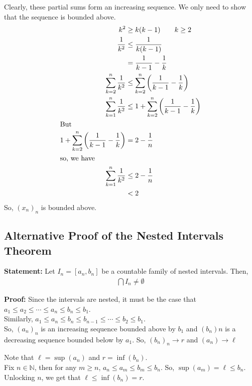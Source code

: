 \documentclass[10pt]{extarticle}
\newcommand{\N}{\mathbb{N}}
\begin{document}
    Clearly, these partial sums form an increasing sequence. We only need to show that the sequence is bounded above.
    \begin{align*}
      k^2 &\geq k(k-1)\tag*{$k\geq 2$}\\
      \frac{1}{k^2} &\leq \frac{1}{k(k-1)}\\
                    &= \frac{1}{k-1}-\frac{1}{k}\\
      \sum_{k=2}^{n} \frac{1}{k^2} &\leq \sum_{k=2}^{n} \left(\frac{1}{k-1}-\frac{1}{k}\right)\\
      \sum_{k=1}^{n} \frac{1}{k^2} &\leq 1 + \sum_{k=2}^{n} \left(\frac{1}{k-1}-\frac{1}{k}\right)\\
      \shortintertext{But}
      1 + \sum_{k=2}^{n} \left(\frac{1}{k-1}-\frac{1}{k}\right) &= 2 - \frac{1}{n}\\
      \shortintertext{so, we have}
      \sum_{k=1}^{n} \frac{1}{k^2} &\leq 2-\frac{1}{n}\\
                                   &< 2
    \end{align*}
    So, $(x_n)_n$ is bounded above.
  \subsection{Alternative Proof of the Nested Intervals Theorem}%
  \textbf{Statement:} Let $I_n = [a_n,b_n]$ be a countable family of nested intervals. Then,
    \begin{align*}
      \bigcap I_n \neq \emptyset
    \end{align*}

    \textbf{Proof:} Since the intervals are nested, it must be the case that $a_{1} \leq a_2 \leq \cdots \leq a_{n} \leq b_{n} \leq b_{1}$.\\

    Similarly, $a_1 \leq a_{n} \leq b_{n} \leq b_{n-1} \leq \cdots \leq b_{2} \leq b_{1}$.\\

    So, $\left(a_n\right)_n$ is an increasing sequence bounded above by $b_{1}$ and $\left(b_n\right)n$ is a decreasing sequence bounded below by $a_{1}$. So, $\left(b_n\right)_n \rightarrow r$ and $\left(a_n\right)\rightarrow \ell$

    Note that $\ell = \sup(a_n)$ and $r = \inf(b_n)$.\\

    Fix $n\in\N$, then for any $m \geq n$, $a_{n} \leq a_{m} \leq b_{m} \leq b_{n}$. So, $\sup(a_m) = \ell \leq b_{n}$. Unlocking $n$, we get that $\ell \leq \inf(b_n) = r$.
\end{document}
